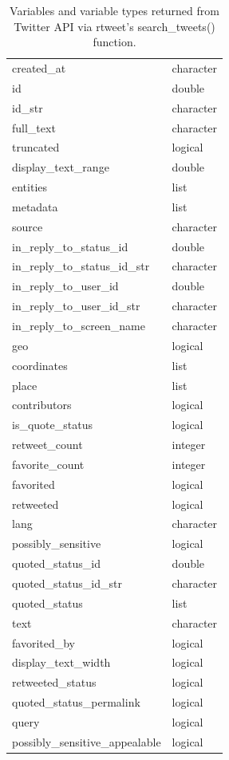 \documentclass[
  letterpaper,
]{latex/krantz}
\begin{document}
\hypertarget{tbl-ad-rtweet-variables-table}{}
\begin{table}
\caption{\label{tbl-ad-rtweet-variables-table}Variables and variable types returned from Twitter API via rtweet's
search\_tweets() function. }\tabularnewline

\centering
\begin{tabular}{ll}
\toprule
created\_at & character\\
id & double\\
id\_str & character\\
full\_text & character\\
truncated & logical\\
\addlinespace
display\_text\_range & double\\
entities & list\\
metadata & list\\
source & character\\
in\_reply\_to\_status\_id & double\\
\addlinespace
in\_reply\_to\_status\_id\_str & character\\
in\_reply\_to\_user\_id & double\\
in\_reply\_to\_user\_id\_str & character\\
in\_reply\_to\_screen\_name & character\\
geo & logical\\
\addlinespace
coordinates & list\\
place & list\\
contributors & logical\\
is\_quote\_status & logical\\
retweet\_count & integer\\
\addlinespace
favorite\_count & integer\\
favorited & logical\\
retweeted & logical\\
lang & character\\
possibly\_sensitive & logical\\
\addlinespace
quoted\_status\_id & double\\
quoted\_status\_id\_str & character\\
quoted\_status & list\\
text & character\\
favorited\_by & logical\\
\addlinespace
display\_text\_width & logical\\
retweeted\_status & logical\\
quoted\_status\_permalink & logical\\
query & logical\\
possibly\_sensitive\_appealable & logical\\
\bottomrule
\end{tabular}
\end{table}
\end{document}
